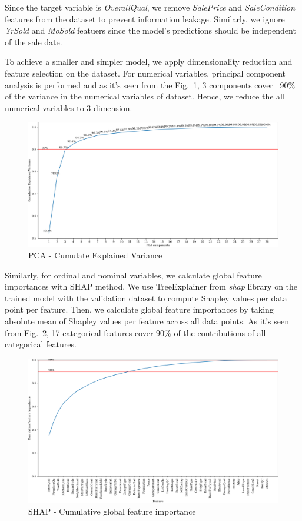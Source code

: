 \documentclass[conference]{IEEEtran}
\begin{document}
Since the target variable is \textit{OverallQual}, 
we remove \textit{SalePrice} and \textit{SaleCondition} features from the dataset to prevent information leakage. 
Similarly, we ignore \textit{YrSold} and \textit{MoSold} featuers since the model's predictions should be independent of the sale date. 

To achieve a smaller and simpler model, we apply dimensionality reduction and feature selection on the dataset.
For numerical variables, principal component analysis is performed and 
as it's seen from the Fig.~\ref{fig:pca-cumulative-explained-variance},
3 components cover ~90\% of the variance in the numerical variables of dataset. 
Hence, we reduce the all numerical variables to 3 dimension.
\begin{figure}[htbp]
    \centerline{\includegraphics[width = 0.5 \textwidth]{pca-cumulative-explained-variance.png}}
    \caption{PCA - Cumulate Explained Variance}
    \label{fig:pca-cumulative-explained-variance}
\end{figure}

Similarly, for ordinal and nominal variables, we calculate global feature importances with SHAP method. 
We use TreeExplainer from \textit{shap} library \cite{tree-explainer} on the trained model with the validation dataset 
to compute Shapley values per data point per feature. Then, we calculate global feature 
importances by taking absolute mean of Shapley values per feature across all data points. 
As it's seen from Fig.~\ref{fig:shap-cumulative-feature-importance}, 17 categorical features cover 
90\% of the contributions of all categorical features.
\begin{figure}[htbp]
    \centerline{\includegraphics[width = 0.5 \textwidth]{shap-cumulative-feature-importance.png}}
    \caption{SHAP - Cumulative global feature importance}
    \label{fig:shap-cumulative-feature-importance}
\end{figure}
\end{document}

